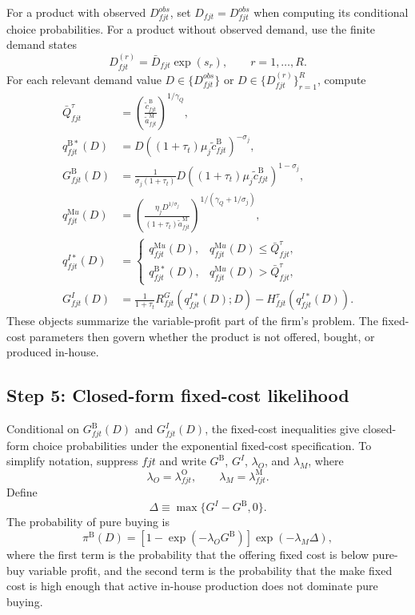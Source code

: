 \documentclass[11pt,a4paper]{article}
\newcommand{\M}{\mathrm{M}}
\newcommand{\B}{\mathrm{B}}
\newcommand{\OFC}{\mathrm{O}}
\begin{document}
For a product with observed $D^{obs}_{fjt}$, set $D_{fjt}=D^{obs}_{fjt}$ when computing its conditional choice probabilities. For a product without observed demand, use the finite demand states
\begin{equation}
    D^{(r)}_{fjt}=\bar D_{fjt}\exp(s_r),
    \qquad r=1,\ldots,R.
    \label{eq:D_states}
\end{equation}
For each relevant demand value $D\in\{D^{obs}_{fjt}\}$ or $D\in\{D^{(r)}_{fjt}\}_{r=1}^R$, compute
\begin{align}
    \bar Q^{\tau}_{fjt}&=\left(\frac{\widetilde c^{\B}_{fjt}}{\widetilde a^{\M}_{fjt}}\right)^{1/\gamma_Q},
    \label{eq:qbar_empirical}\\
    q^{\B *}_{fjt}(D)&=D\left((1+\tau_t)\mu_j\widetilde c^{\B}_{fjt}\right)^{-\sigma_j},
    \label{eq:qB_empirical}\\
    G^{\B}_{fjt}(D)&=\frac{1}{\sigma_j(1+\tau_t)}D\left((1+\tau_t)\mu_j\widetilde c^{\B}_{fjt}\right)^{1-\sigma_j},
    \label{eq:GB_empirical}\\
    q^{\M u}_{fjt}(D)&=\left(\frac{\eta_jD^{1/\sigma_j}}{(1+\tau_t)\widetilde a^{\M}_{fjt}}\right)^{1/(\gamma_Q+1/\sigma_j)},
    \label{eq:qMu_empirical}\\
    q^{I*}_{fjt}(D)&=\begin{cases}
        q^{\M u}_{fjt}(D), & q^{\M u}_{fjt}(D)\leq\bar Q^{\tau}_{fjt},\\
        q^{\B *}_{fjt}(D), & q^{\M u}_{fjt}(D)>\bar Q^{\tau}_{fjt},
    \end{cases}
    \label{eq:qI_empirical}\\
    G^{I}_{fjt}(D)&=\frac{1}{1+\tau_t}R^G_{fjt}(q^{I*}_{fjt}(D);D)-H^{\tau}_{fjt}(q^{I*}_{fjt}(D)).
    \label{eq:GI_empirical}
\end{align}
These objects summarize the variable-profit part of the firm's problem. The fixed-cost parameters then govern whether the product is not offered, bought, or produced in-house.

\subsection{Step 5: Closed-form fixed-cost likelihood}

Conditional on $G^{\B}_{fjt}(D)$ and $G^I_{fjt}(D)$, the fixed-cost inequalities give closed-form choice probabilities under the exponential fixed-cost specification. To simplify notation, suppress $fjt$ and write $G^\B$, $G^I$, $\lambda_O$, and $\lambda_M$, where
\[
    \lambda_O=\lambda^{\OFC}_{fjt},
    \qquad
    \lambda_M=\lambda^{\M}_{fjt}.
\]
Define
\begin{equation}
    \Delta\equiv \max\{G^I-G^\B,0\}.
    \label{eq:Delta_def}
\end{equation}
The probability of pure buying is
\begin{equation}
    \pi^{\B}(D)
    =\left[1-\exp(-\lambda_O G^\B)\right]
    \exp(-\lambda_M\Delta),
    \label{eq:prob_buy_closed}
\end{equation}
where the first term is the probability that the offering fixed cost is below pure-buy variable profit, and the second term is the probability that the make fixed cost is high enough that active in-house production does not dominate pure buying.
\end{document}
